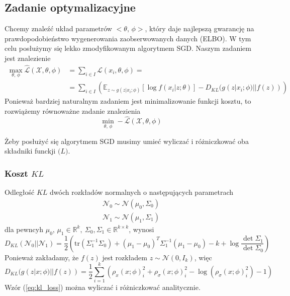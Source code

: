 \documentclass[12pt]{extarticle}
\begin{document}
\subsection{Zadanie optymalizacyjne}
Chcemy znaleźć układ parametrów $<\theta,\,\phi>$, który daje najlepszą
gwarancję na prawdopodobieństwo wygenerowania zaobserwowanych danych (ELBO).
W tym celu posłużymy się lekko zmodyfikowanym algorytmem SGD.
Naszym zadaniem jest znalezienie
\begin{equation}
\begin{split}
\max_{\theta,\,\phi} \hat{\mathcal{L}}(\mathcal{X}, \theta, \phi) &= \sum_{i \in I}\mathcal{L}(x_i, \theta, \phi) = \\
&=\sum_{i \in I} \left( \mathbb{E}_{z\sim g(z|x_i;\phi)}\left[\log f(x_i|z;\theta)\right] - D_{KL}(g(z|x_i;\phi) || f(z)) \right)
\end{split}
\end{equation}
Ponieważ bardziej naturalnym zadaniem jest minimalizowanie funkcji kosztu,
to rozwiążemy równoważne zadanie znalezienia
\begin{equation}
\min_{\theta,\,\phi} -\hat{\mathcal{L}}(\mathcal{X}, \theta, \phi)
\end{equation}

Żeby posłużyć się algorytmem SGD musimy umieć wyliczać i różniczkować
oba składniki funckji $\mathcal(L)$.

\subsubsection{Koszt $KL$}
Odległość $KL$ dwóch rozkładów normalnych o następujących parametrach
\begin{equation*}
\begin{split}
\mathcal{N}_0 \sim \mathcal{N}(\mu_0, \Sigma_0) \\
\mathcal{N}_1 \sim \mathcal{N}(\mu_1, \Sigma_1)
\end{split}
\end{equation*}
dla pewncyh $\mu_0,\,\mu_1 \in \mathbb{R}^k,\ \Sigma_0, \Sigma_1 \in \mathbb{R}^{k \times k}$, wynosi
\begin{equation*}
D_{KL}(\mathcal{N}_0||\mathcal{N}_1) = \frac{1}{2} \left(\text{tr}(\Sigma_1^{-1}\Sigma_0)
+ (\mu_1-\mu_0)^T \Sigma_1^{-1} (\mu_1-\mu_0) -k + \log\frac{\det\Sigma_1}{\det\Sigma_0} \right)
\end{equation*}
Ponieważ zakładamy, że $f(z)$ jest rozkładem $z \sim \mathcal{N}(0, I_k)$, więc
\begin{equation}
D_{KL}(g(z|x;\phi) || f(z)) = \frac{1}{2}\sum_{i=1}^k
\left( \rho_x(x;\phi)_i^2 + \rho_\sigma(x;\phi)_i^2 - \log(\rho_\sigma(x;\phi)_i^2)-1 \right)
\label{eq:kl_loss}
\end{equation}
Wzór (\ref{eq:kl_loss}) można wyliczać i różniczkować analitycznie.
\end{document}
